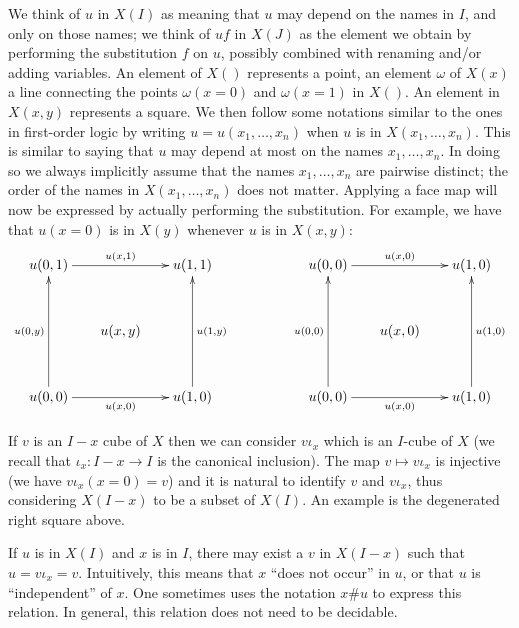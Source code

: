 \documentclass[10pt,a4paper]{article}
\begin{document}
We think of $u$ in $X(I)$ as meaning that $u$ may depend on the names
in $I$, and only on those names; we think of $uf$ in $X(J)$ as the
element we obtain by performing the substitution $f$ on $u$, possibly
combined with renaming and/or adding variables.  An element of $X()$
represents a point, an element $\omega$ of $X(x)$ a line connecting
the points $\omega(x=0)$ and $\omega(x=1)$ in $X()$. An element in
$X(x,y)$ represents a square.  We then follow some notations similar
to the ones in first-order logic by writing $u = u(x_1,\dots,x_n)$
when $u$ is in $X(x_1,\dots,x_n)$. This is similar to saying that $u$
may depend at most on the names $x_1,\dots,x_n$.  In doing so we
always implicitly assume that the names $x_1,\dots,x_n$ are pairwise
distinct; the order of the names in $X(x_1,\dots,x_n)$ does not
matter. Applying a face map will now be expressed by actually
performing the substitution. For example, we have that $u(x=0)$ is in
$X(y)$ whenever $u$ is in $X(x,y)$:
\[
\xymatrix@R=1.1cm@C=.6cm{
u(0,1)\ar[rr]^{u(x,1)}                &      & u(1,1)                   &&&
u(0,0)\ar[rr]^{u(x,0)}                &      & u(1,0)                       \\
                                      &u(x,y)&                          &&&
                                      &u(x,0)&                              \\
u(0,0)\ar[rr]_{u(x,0)}\ar[uu]^{u(0,y)}&      & u(1,0)\ar[uu]_{u(1,y)}   &&&
u(0,0)\ar[rr]_{u(x,0)}\ar[uu]^{u(0,0)}&      & u(1,0)\ar[uu]_{u(1,0)}       \\
}
\]

If $v$ is an $I-x$ cube of $X$ then we can consider $v\iota_x$ which is an
$I$-cube of $X$ (we recall that $\iota_x:I-x\to I$ is the canonical
inclusion). The map $v\longmapsto v\iota_x$ is injective (we have
$v\iota_x(x=0) = v$) and it is natural to identify $v$ and
$v\iota_x$, thus considering $X(I-x)$ to be a subset of $X(I)$. An example
is the degenerated right square above.

 If $u$ is in $X(I)$ and $x$ is in $I$, there may exist a $v$ in $X(I-x)$ such that
$u = v\iota_x = v$.  Intuitively, this means that $x$ ``does not occur'' in $u$, or that $u$ is
``independent'' of $x$. One sometimes uses the notation $x\#u$ to express this relation. In general, this relation does
not need to be decidable.
\end{document}
